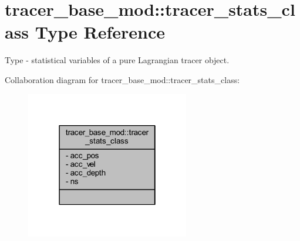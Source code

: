 \hypertarget{structtracer__base__mod_1_1tracer__stats__class}{}\section{tracer\+\_\+base\+\_\+mod\+:\+:tracer\+\_\+stats\+\_\+class Type Reference}
\label{structtracer__base__mod_1_1tracer__stats__class}


Type -\/ statistical variables of a pure Lagrangian tracer object.  




Collaboration diagram for tracer\+\_\+base\+\_\+mod\+:\+:tracer\+\_\+stats\+\_\+class\+:
\nopagebreak
\begin{figure}[H]
\begin{center}
\leavevmode
\includegraphics[width=202pt]{structtracer__base__mod_1_1tracer__stats__class__coll__graph}
\end{center}
\end{figure}
